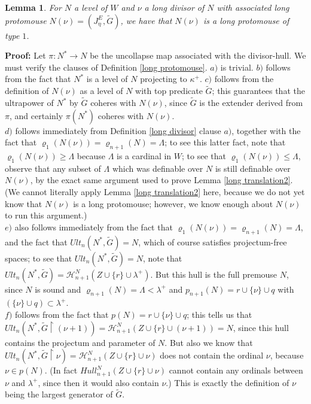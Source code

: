 \documentclass[12pt]{article}
\newtheorem{lem}[thm]{Lemma}
\begin{document}
\begin{lem}
For $N$ a level of $W$ and $\nu$ a long divisor of $N$ with associated long protomouse $N (\nu) = (J_\eta^E , \tilde{G} )$, we have that $N (\nu)$ is a long protomouse of type $1$.
\end{lem}


\textbf{Proof:} Let $\pi : N^* \longrightarrow N$ be the uncollapse map associated with the divisor-hull.  We must verify the clauses of Definition \ref{long protomouse}.  $a)$ is trivial. $b)$ follows from the fact that $N^*$ is a level of $N$ projecting to $\kappa^+$.  $c)$ follows from the definition of $N (\nu)$ as a level of $N$ with top predicate $\tilde{G}$; this guarantees that the ultrapower of $N^*$ by $\tilde{G}$ coheres with $N (\nu)$, since $\tilde{G}$ is the extender derived from $\pi$, and certainly $\pi (N^*)$ coheres with $N (\nu)$.\\

$d)$ follows immediately from Definition \ref{long divisor} clause $a)$, together with the fact that $\varrho_1 (N(\nu)) = \varrho_{n+1} (N) = \Lambda$; to see this latter fact, note that $\varrho_1 (N (\nu)) \geq \Lambda$ because $\Lambda$ is a cardinal in $W$; to see that $\varrho_1 (N (\nu )) \leq \Lambda$, observe that any subset of $\Lambda$ which was definable over $N$ is still definable over $N(\nu)$, by the exact same argument used to prove Lemma \ref{long translation2}.  (We cannot literally apply Lemma \ref{long translation2} here, because we do not yet know that $N(\nu)$ is a long protomouse; however, we know enough about $N (\nu)$ to run this argument.)\\

$e)$ also follows immediately from the fact that $\varrho_1 (N(\nu)) = \varrho_{n+1} (N) = \Lambda$, and the fact that $Ult_n (N^* , \tilde{G}) = N$, which of course satisfies projectum-free spaces; to see that $Ult_n (N^* , \tilde{G}) = N$, note that $Ult_n (N^* , \tilde{G}) = \mathcal{H}_{n+1}^N ( Z \cup \{ r \} \cup \lambda^+)$.  But this hull is the full premouse $N$, since $N$ is sound and $\varrho_{n+1} (N) = \Lambda < \lambda^+$ and $p _{n+1}(N) = r \cup \{ \nu \} \cup q$ with $( \{ \nu \} \cup q ) \subset \lambda^+$.\\

$f)$ follows from the fact that $p(N) = r \cup \{ \nu \} \cup q$; this tells us that $Ult_n (N^* , \tilde{G} \restriction (\nu + 1)) = \mathcal{H}_{n+1}^N ( Z \cup \{ r \} \cup (\nu + 1 )) = N$, since this hull contains the projectum and parameter of $N$.  But also we know that $Ult_n (N^* , \tilde{G} \restriction \nu) = \mathcal{H}_{n+1}^N ( Z \cup \{ r \} \cup \nu )$ does not contain the ordinal $\nu$, because $\nu \in p(N)$.  (In fact $Hull_{n+1}^N ( Z \cup \{ r \} \cup \nu )$ cannot contain any ordinals between $\nu$ and $\lambda^+$, since then it would also contain $\nu$.)  This is exactly the definition of $\nu$ being the largest generator of $\tilde{G}$.\\
\end{document}
